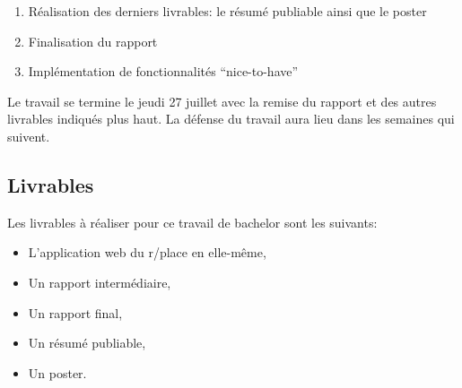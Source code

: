 \begin{enumerate}
  \item Réalisation des derniers livrables: le résumé publiable ainsi que le poster
  \item Finalisation du rapport
  \item Implémentation de fonctionnalités “nice-to-have”
\end{enumerate}

Le travail se termine le jeudi 27 juillet avec la remise du rapport et des autres livrables indiqués plus haut. La défense du travail aura lieu dans les semaines qui suivent.

\subsection{Livrables}

Les livrables à réaliser pour ce travail de bachelor sont les suivants:

\begin{itemize}
  \item L'application web du r/place en elle-même,
  \item Un rapport intermédiaire,
  \item Un rapport final,
  \item Un résumé publiable,
  \item Un poster.
\end{itemize}


